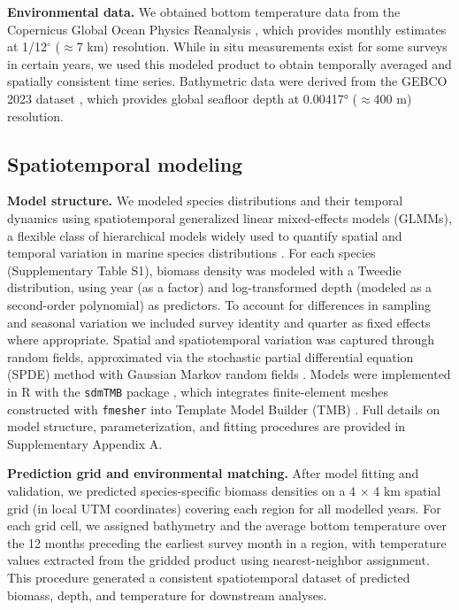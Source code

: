 \documentclass[pdflatex,sn-nature,referee]{sn-jnl}%
\begin{document}
\noindent
\textbf{Environmental data.} We obtained bottom temperature data from the Copernicus Global Ocean Physics Reanalysis \citep{european_union-copernicus_marine_service_global_2018}, which provides monthly estimates at 1/12$^{\circ}$ ($\approx$7 km) resolution. While in situ measurements exist for some surveys in certain years, we used this modeled product to obtain temporally averaged and spatially consistent time series. Bathymetric data were derived from the GEBCO 2023 dataset \citep{gebco_bathymetric_compilation_group_2023_gebco_2023_2023}, which provides global seafloor depth at 0.00417° ($\approx$400 m) resolution.



\subsection{Spatiotemporal modeling}\label{sec:Species spatiotemporal modeling}

\textbf{Model structure.} We modeled species distributions and their temporal dynamics using spatiotemporal generalized linear mixed-effects models (GLMMs), a flexible class of hierarchical models widely used to quantify spatial and temporal variation in marine species distributions \citep{thorson_geostatistical_2015, thorson_model-based_2016}. For each species (Supplementary Table S1), biomass density was modeled with a Tweedie distribution, using year (as a factor) and log-transformed depth (modeled as a second-order polynomial) as predictors. To account for differences in sampling and seasonal variation we included survey identity and quarter as fixed effects where appropriate. Spatial and spatiotemporal variation was captured through random fields, approximated via the stochastic partial differential equation (SPDE) method with Gaussian Markov random fields \citep{lindgren_explicit_2011}. Models were implemented in R with the \texttt{sdmTMB} package \citep{sdmTMB2025}, which integrates finite-element meshes constructed with \texttt{fmesher} \citep{lindgren_fmesher_2025} into Template Model Builder (TMB) \citep{kristensen_tmb_2016}. Full details on model structure, parameterization, and fitting procedures are provided in Supplementary Appendix A.



\noindent
\textbf{Prediction grid and environmental matching.} 
After model fitting and validation, we predicted species-specific biomass densities on a 4 × 4 km spatial
grid (in local UTM coordinates) covering each region for all modelled years. For each grid cell, we assigned bathymetry and the average bottom temperature over the 12 months preceding the earliest survey month in a region, with temperature values extracted from the gridded product using nearest-neighbor assignment. This procedure generated a consistent spatiotemporal dataset of predicted biomass, depth, and temperature for downstream analyses.
\end{document}
